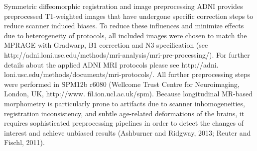 \documentclass[final, paper=letter,5p,times,twocolumn]{elsarticle}
\theoremstyle{definition}
\begin{document}
Symmetric diffeomorphic registration and image preprocessing ADNI provides preprocessed T1-weighted images that have undergone specific correction steps to reduce scanner induced biases. To reduce these influences and minimize effects due to heterogeneity of protocols, all included images were chosen to match the MPRAGE with Gradwarp, B1 correction and N3 specification (see http://adni.loni.usc.edu/methods/mri-analysis/mri-pre-processing/). For further details about the applied ADNI MRI protocols please see http://adni. loni.usc.edu/methods/documents/mri-protocols/. All further preprocessing steps were performed in SPM12b r6080 (Wellcome Trust Centre for Neuroimaging, London, UK, http://www. fil.ion.ucl.ac.uk/spm). Because longitudinal MR-based morphometry is particularly prone to artifacts due to scanner inhomogeneities, registration inconsistency, and subtle age-related deformations of the brains, it requires sophisticated preprocessing pipelines in order to detect the changes of interest and achieve unbiased results (Ashburner and Ridgway, 2013; Reuter and Fischl, 2011). \\
\end{document}
